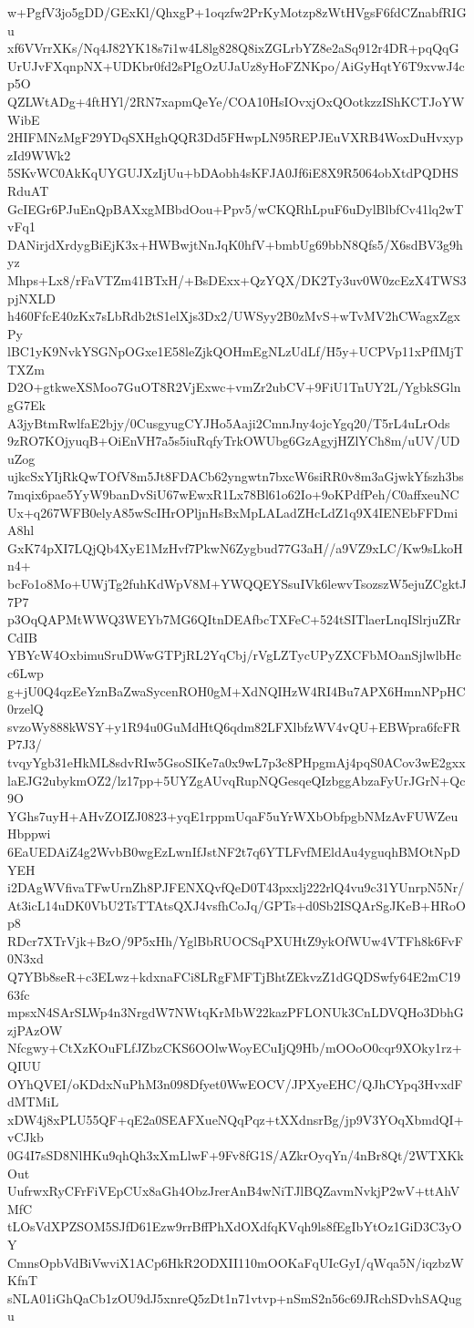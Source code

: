 w+PgfV3jo5gDD/GExKl/QhxgP+1oqzfw2PrKyMotzp8zWtHVgsF6fdCZnabfRIGu
xf6VVrrXKs/Nq4J82YK18s7i1w4L8lg828Q8ixZGLrbYZ8e2aSq912r4DR+pqQqG
UrUJvFXqnpNX+UDKbr0fd2sPIgOzUJaUz8yHoFZNKpo/AiGyHqtY6T9xvwJ4cp5O
QZLWtADg+4ftHYl/2RN7xapmQeYe/COA10HsIOvxjOxQOotkzzIShKCTJoYWWibE
2HIFMNzMgF29YDqSXHghQQR3Dd5FHwpLN95REPJEuVXRB4WoxDuHvxypzId9WWk2
5SKvWC0AkKqUYGUJXzIjUu+bDAobh4sKFJA0Jf6iE8X9R5064obXtdPQDHSRduAT
GcIEGr6PJuEnQpBAXxgMBbdOou+Ppv5/wCKQRhLpuF6uDylBlbfCv41lq2wTvFq1
DANirjdXrdygBiEjK3x+HWBwjtNnJqK0hfV+bmbUg69bbN8Qfs5/X6sdBV3g9hyz
Mhps+Lx8/rFaVTZm41BTxH/+BsDExx+QzYQX/DK2Ty3uv0W0zcEzX4TWS3pjNXLD
h460FfcE40zKx7sLbRdb2tS1elXjs3Dx2/UWSyy2B0zMvS+wTvMV2hCWagxZgxPy
lBC1yK9NvkYSGNpOGxe1E58leZjkQOHmEgNLzUdLf/H5y+UCPVp11xPfIMjTTXZm
D2O+gtkweXSMoo7GuOT8R2VjExwc+vmZr2ubCV+9FiU1TnUY2L/YgbkSGlngG7Ek
A3jyBtmRwlfaE2bjy/0CusgyugCYJHo5Aaji2CmnJny4ojcYgq20/T5rL4uLrOds
9zRO7KOjyuqB+OiEnVH7a5s5iuRqfyTrkOWUbg6GzAgyjHZlYCh8m/uUV/UDuZog
ujkcSxYIjRkQwTOfV8m5Jt8FDACb62yngwtn7bxcW6siRR0v8m3aGjwkYfszh3bs
7mqix6pae5YyW9banDvSiU67wEwxR1Lx78Bl61o62Io+9oKPdfPeh/C0affxeuNC
Ux+q267WFB0elyA85wScIHrOPljnHsBxMpLALadZHcLdZ1q9X4IENEbFFDmiA8hl
GxK74pXI7LQjQb4XyE1MzHvf7PkwN6Zygbud77G3aH//a9VZ9xLC/Kw9sLkoHn4+
bcFo1o8Mo+UWjTg2fuhKdWpV8M+YWQQEYSsuIVk6lewvTsozszW5ejuZCgktJ7P7
p3OqQAPMtWWQ3WEYb7MG6QItnDEAfbcTXFeC+524tSITlaerLnqISlrjuZRrCdIB
YBYcW4OxbimuSruDWwGTPjRL2YqCbj/rVgLZTycUPyZXCFbMOanSjlwlbHcc6Lwp
g+jU0Q4qzEeYznBaZwaSycenROH0gM+XdNQIHzW4RI4Bu7APX6HmnNPpHC0rzelQ
svzoWy888kWSY+y1R94u0GuMdHtQ6qdm82LFXlbfzWV4vQU+EBWpra6fcFRP7J3/
tvqyYgb31eHkML8sdvRIw5GsoSIKe7a0x9wL7p3c8PHpgmAj4pqS0ACov3wE2gxx
laEJG2ubykmOZ2/lz17pp+5UYZgAUvqRupNQGesqeQIzbggAbzaFyUrJGrN+Qc9O
YGhs7uyH+AHvZOIZJ0823+yqE1rppmUqaF5uYrWXbObfpgbNMzAvFUWZeuHbppwi
6EaUEDAiZ4g2WvbB0wgEzLwnIfJstNF2t7q6YTLFvfMEldAu4yguqhBMOtNpDYEH
i2DAgWVfivaTFwUrnZh8PJFENXQvfQeD0T43pxxlj222rlQ4vu9c31YUnrpN5Nr/
At3icL14uDK0VbU2TsTTAtsQXJ4vsfhCoJq/GPTs+d0Sb2ISQArSgJKeB+HRoOp8
RDcr7XTrVjk+BzO/9P5xHh/YglBbRUOCSqPXUHtZ9ykOfWUw4VTFh8k6FvF0N3xd
Q7YBb8seR+c3ELwz+kdxnaFCi8LRgFMFTjBhtZEkvzZ1dGQDSwfy64E2mC1963fc
mpsxN4SArSLWp4n3NrgdW7NWtqKrMbW22kazPFLONUk3CnLDVQHo3DbhGzjPAzOW
Nfcgwy+CtXzKOuFLfJZbzCKS6OOlwWoyECuIjQ9Hb/mOOoO0cqr9XOky1rz+QIUU
OYhQVEI/oKDdxNuPhM3n098Dfyet0WwEOCV/JPXyeEHC/QJhCYpq3HvxdFdMTMiL
xDW4j8xPLU55QF+qE2a0SEAFXueNQqPqz+tXXdnsrBg/jp9V3YOqXbmdQI+vCJkb
0G4I7sSD8NlHKu9qhQh3xXmLlwF+9Fv8fG1S/AZkrOyqYn/4nBr8Qt/2WTXKkOut
UufrwxRyCFrFiVEpCUx8aGh4ObzJrerAnB4wNiTJlBQZavmNvkjP2wV+ttAhVMfC
tLOsVdXPZSOM5SJfD61Ezw9rrBffPhXdOXdfqKVqh9ls8fEgIbYtOz1GiD3C3yOY
CmnsOpbVdBiVwviX1ACp6HkR2ODXII110mOOKaFqUIcGyI/qWqa5N/iqzbzWKfnT
sNLA01iGhQaCb1zOU9dJ5xnreQ5zDt1n71vtvp+nSmS2n56c69JRchSDvhSAQugu
